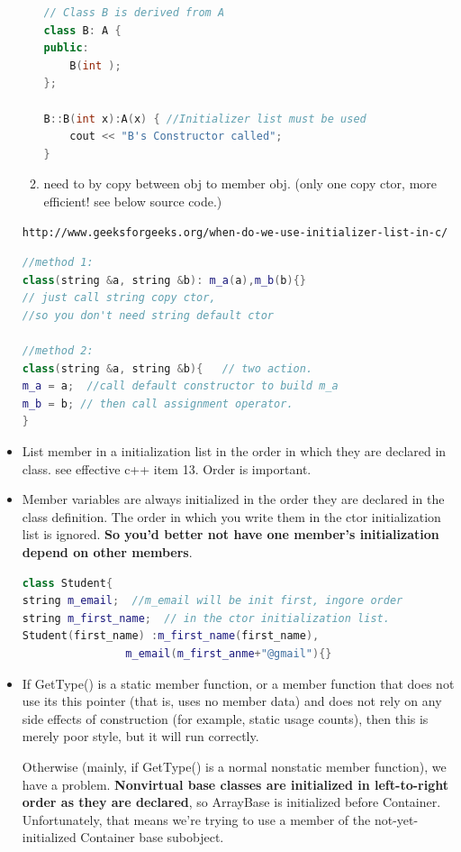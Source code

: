 \documentclass[a4paper,12pt,twoside]{book}
\begin{document}
\begin{itemize}
\begin{enumerate}
\begin{lstlisting}[frame=single, language=c++]
// Class B is derived from A
class B: A {
public:
    B(int );
};

B::B(int x):A(x) { //Initializer list must be used
    cout << "B's Constructor called";
}
\end{lstlisting}

\item need to by copy between obj to member obj. (only one copy ctor, more efficient! see below source code.)
\end{enumerate}

\begin{verbatim}
http://www.geeksforgeeks.org/when-do-we-use-initializer-list-in-c/
\end{verbatim}

\begin{lstlisting}[frame=single, language=c++]
//method 1:
class(string &a, string &b): m_a(a),m_b(b){}
// just call string copy ctor,
//so you don't need string default ctor

//method 2:
class(string &a, string &b){   // two action.
m_a = a;  //call default constructor to build m_a
m_b = b; // then call assignment operator.
}
\end{lstlisting}

\item List member in a initialization list in the order in which they are declared in class. see effective c++ item 13. Order is important.

\item Member variables are always initialized in the order they are declared in the class definition. The order in which you write them in the ctor initialization list is ignored.  \textbf{So you'd better not have one member's initialization depend on other members}.
\begin{lstlisting}[frame=single, language=c++]
class Student{
string m_email;  //m_email will be init first, ingore order
string m_first_name;  // in the ctor initialization list.
Student(first_name) :m_first_name(first_name),
                m_email(m_first_anme+"@gmail"){}
\end{lstlisting}


\item If GetType() is a static member function, or a member function that does not use its this
pointer (that is, uses no member data) and does not rely on any side effects of construction (for
example, static usage counts), then this is merely poor style, but it will run correctly.

Otherwise (mainly, if GetType() is a normal nonstatic member function), we have a problem.
\textbf{Nonvirtual base classes are initialized in left-to-right order as they are declared}, so ArrayBase
is initialized before Container. Unfortunately, that means we're trying to use a member of the
not-yet-initialized Container base subobject.


\end{itemize}
\end{document}
